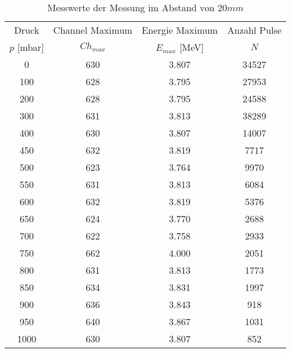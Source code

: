 \begin{table}[!h]
	\centering
	\begin{tabular}{|c|c|c|c|}
		\hline
		Druck & Channel Maximum & Energie Maximum & Anzahl Pulse\\
		$p$ [\si{\milli\bar}] & $Ch_{max}$ & $E_{max}$ [\si{\mega\eV}] & $N$\\
\hline\hline
		\num{0} & \num{630} & \num{3.807} & \num{34527}\\
		\num{100} & \num{628} & \num{3.795} & \num{27953}\\
		\num{200} & \num{628} & \num{3.795} & \num{24588}\\
		\num{300} & \num{631} & \num{3.813} & \num{38289}\\
		\num{400} & \num{630} & \num{3.807} & \num{14007}\\
		\num{450} & \num{632} & \num{3.819} & \num{7717}\\
		\num{500} & \num{623} & \num{3.764} & \num{9970}\\
		\num{550} & \num{631} & \num{3.813} & \num{6084}\\
		\num{600} & \num{632} & \num{3.819} & \num{5376}\\
		\num{650} & \num{624} & \num{3.770} & \num{2688}\\
		\num{700} & \num{622} & \num{3.758} & \num{2933}\\
		\num{750} & \num{662} & \num{4.000} & \num{2051}\\
		\num{800} & \num{631} & \num{3.813} & \num{1773}\\
		\num{850} & \num{634} & \num{3.831} & \num{1997}\\
		\num{900} & \num{636} & \num{3.843} & \num{918}\\
		\num{950} & \num{640} & \num{3.867} & \num{1031}\\
		\num{1000} & \num{630} & \num{3.807} & \num{852}\\
		\hline
	\end{tabular}
	\caption{Messwerte der Messung im Abstand von $20 \si{mm}$ \label{tab:Messwerte_I}}
\end{table}
